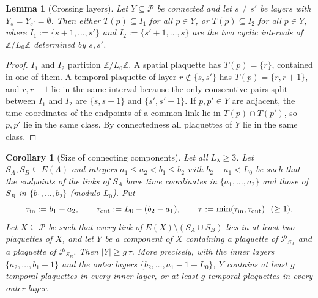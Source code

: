 \documentclass[11pt,a4paper]{article}
\newtheorem{lemma}[theorem]{Lemma}
\newtheorem{corollary}[theorem]{Corollary}
\theoremstyle{definition}
\theoremstyle{remark}
\newcommand{\Z}{\mathbb{Z}}
\newcommand{\cP}{\mathcal{P}}
\begin{document}
\begin{lemma}[Crossing layers]\label{mg:lem:crossing}
Let $Y\subseteq\cP$ be connected and let $s\neq s'$ be layers with $Y_s=Y_{s'}=\emptyset$. Then either $T(p)\subseteq I_1$ for all
$p\in Y$, or $T(p)\subseteq I_2$ for all $p\in Y$, where $I_1:=\{s+1,\dots,s'\}$ and $I_2:=\{s'+1,\dots,s\}$ are the two cyclic
intervals of $\Z/L_0\Z$ determined by $s,s'$.
\end{lemma}

\begin{proof}
$I_1$ and $I_2$ partition $\Z/L_0\Z$. A spatial plaquette has $T(p)=\{r\}$, contained in one of them. A temporal plaquette of layer
$r\notin\{s,s'\}$ has $T(p)=\{r,r+1\}$, and $r,r+1$ lie in the same interval because the only consecutive pairs split between
$I_1$ and $I_2$ are $\{s,s+1\}$ and $\{s',s'+1\}$. If $p,p'\in Y$ are adjacent, the time coordinates of the endpoints of a
common link lie in $T(p)\cap T(p')$, so $p,p'$ lie in the same class. By connectedness all plaquettes of $Y$ lie in the same class.
\end{proof}

\begin{corollary}[Size of connecting components]\label{mg:cor:size}
Let all $L_\lambda\ge3$. Let $S_A,S_B\subseteq E(\Lambda)$ and integers $a_1\le a_2<b_1\le b_2$ with $b_2-a_1<L_0$ be such that the
endpoints of the links of $S_A$ have time coordinates in $\{a_1,\dots,a_2\}$ and those of $S_B$ in $\{b_1,\dots,b_2\}$ (modulo $L_0$). Put
\[
\tau_{\rm in}:=b_1-a_2,\qquad \tau_{\rm out}:=L_0-(b_2-a_1),\qquad \tau:=\min(\tau_{\rm in},\tau_{\rm out})\ \ (\ge1).
\]
Let $X\subseteq\cP$ be such that every link of $E(X)\setminus(S_A\cup S_B)$ lies in at least two plaquettes of $X$, and let $Y$ be a
component of $X$ containing a plaquette of $\cP_{S_A}$ and a plaquette of $\cP_{S_B}$. Then $|Y|\ge g\,\tau$. More precisely, with
the inner layers $\{a_2,\dots,b_1-1\}$ and the outer layers $\{b_2,\dots,a_1-1+L_0\}$, $Y$ contains at least $g$ temporal plaquettes
in every inner layer, or at least $g$ temporal plaquettes in every outer layer.
\end{corollary}
\end{document}
